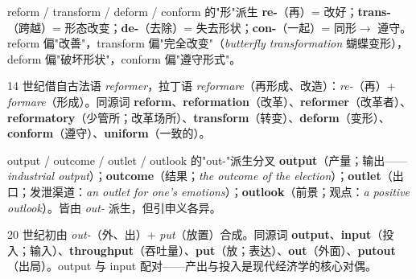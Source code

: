 \documentclass[../main.tex]{subfiles}
\begin{document}
\begin{gram}{reform / transform / deform / conform 的"形"派生}
\textbf{re-}（再）= 改好；\textbf{trans-}（跨越）= 形态改变；\textbf{de-}（去除）= 失去形状；\textbf{con-}（一起）= 同形$\to$ 遵守。reform 偏"改善"，transform 偏"完全改变"（\textit{butterfly transformation} 蝴蝶变形），deform 偏"破坏形状"，conform 偏"遵守形式"。
\end{gram}

\begin{origin}
14 世纪借自古法语 \textit{reformer}，拉丁语 \textit{reformare}（再形成、改造）：\textit{re-}（再）+ \textit{formare}（形成）。同源词 \textbf{reform}、\textbf{reformation}（改革）、\textbf{reformer}（改革者）、\textbf{reformatory}（少管所；改革场所）、\textbf{transform}（转变）、\textbf{deform}（变形）、\textbf{conform}（遵守）、\textbf{uniform}（一致的）。
\end{origin}



\begin{lex}{output / outcome / outlet / outlook 的"out-"派生分叉}
\textbf{output}（产量；输出——\textit{industrial output}）；\textbf{outcome}（结果；\textit{the outcome of the election}）；\textbf{outlet}（出口；发泄渠道：\textit{an outlet for one's emotions}）；\textbf{outlook}（前景；观点：\textit{a positive outlook}）。皆由 \textit{out-} 派生，但引申义各异。
\end{lex}

\begin{origin}
20 世纪初由 \textit{out-}（外、出）+ \textit{put}（放置）合成。同源词 \textbf{output}、\textbf{input}（投入；输入）、\textbf{throughput}（吞吐量）、\textbf{put}（放；表达）、\textbf{out}（外面）、\textbf{putout}（出局）。output 与 input 配对——产出与投入是现代经济学的核心对偶。
\end{origin}



\end{document}
